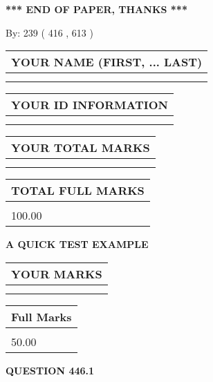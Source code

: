 \documentclass[12pt]{article}
\begin{document}
\vspace{1.0in} 
{\textbf{\large{ *** END OF PAPER, THANKS *** }}} 
   
   
\hspace{1.0in} By: 
 239 ( 416 ,  613 )
   
   
   
   
\newpage 
\setcounter{page}{ 
   446001 } 
   
   
   
   
\noindent\begin{tabular}{|l|}
\hline
YOUR NAME (FIRST, ... LAST)  \\
\hline
 \\ 
 \\ 
\hline
\end{tabular}
\hspace{0.05in} \begin{tabular}{|l|}
\hline
 YOUR   ID   INFORMATION  \\
\hline
 \\ 
 \\ 
\hline
\end{tabular}
   
   
\vspace{0.2in}\noindent\begin{tabular}{|l|}
\hline
YOUR TOTAL MARKS  \\
\hline
 \\ 
 \\ 
\hline
\end{tabular}
\hspace{0.05in} \begin{tabular}{|l|}
\hline
TOTAL FULL MARKS  \\
\hline
 \\ 
100.00 \\
\hline
\end{tabular}
   
   
 \vspace{0.2in}
{\LARGE {\textbf{ A QUICK TEST EXAMPLE}}}
   
   
  
\vspace{0.2in}
  
\noindent\begin{tabular}{|l|}
\hline
 YOUR MARKS  \\
\hline
 \\ 
 \\ 
\hline
\end{tabular}
\hspace{0.05in} \begin{tabular}{|l|}
\hline
 Full Marks  \\
\hline
 \\ 
50.00 \\
\hline
\end{tabular}
{\textbf{\Large{QUESTION
446.1 
}}}
  
\end{document}
